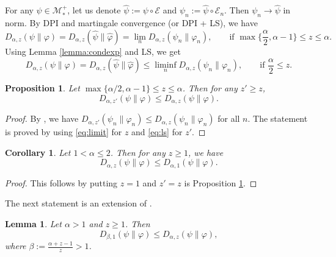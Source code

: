 \documentclass[12pt]{article}
\newtheorem{lemma}{Lemma}
\newtheorem{prop}{Proposition}
\newtheorem{coro}{Corollary}
\theoremstyle{definition}
\theoremstyle{remark}
\def\Me{\mathcal M}
\def\Ee{\mathcal E}
\begin{document}
 

For any $\psi\in \Me_*^+$, let us denote $\hat\psi:=\psi\circ\Ee$ and $\psi_n:=\hat
\psi\circ\Ee_n$. Then $\psi_n\to \hat \psi$ in norm. 
By DPI and  martingale convergence (or DPI + LS), we have
\begin{equation}\label{eq:limit}
D_{\alpha,z}(\psi\|\varphi)=D_{\alpha,z}(\hat\psi\|\hat\varphi)=\lim_nD_{\alpha,z}(\psi_n\|\varphi_n),\qquad \text{if }
\max\{\frac{\alpha}2,\alpha-1\}\le z\le \alpha.
\end{equation}
Using Lemma \ref{lemma:condexp} and  LS, we get 
\begin{equation}\label{eq:ls}
D_{\alpha,z}(\psi\|\varphi)=D_{\alpha,z}(\hat\psi\|\hat\varphi)\le \liminf_nD_{\alpha,z}(\psi_n\|\varphi_n),\qquad \text{if }
\frac{\alpha}2\le z.
\end{equation}


\begin{prop}\label{prop:monotz}
Let $\max\{\alpha/2,\alpha-1\}\le z\le \alpha$. Then for any $z'\ge z$,
\[
D_{\alpha,z'}(\psi\|\varphi)\le D_{\alpha,z}(\psi\|\varphi).
\]
\end{prop}

\begin{proof}
By \cite[Lemma 1.3]{FHnote3}, we have $D_{\alpha,z'}(\psi_n\|\varphi_n)\le
D_{\alpha,z}(\psi_n\|\varphi_n)$ for all $n$. The statement  is proved  by using \eqref{eq:limit} for $z$ and
\eqref{eq:ls} for $z'$.

\end{proof}


\begin{coro}\label{coro:bound1}
Let $1<\alpha\le 2$. Then for any $z\ge 1$, we have
\[
 D_{\alpha,z}(\psi\|\varphi)\le D_{\alpha,1}(\psi\|\varphi).
\]


\end{coro}

\begin{proof} This follows
by putting $z=1$ and $z'=z$ is  Proposition \ref{prop:monotz}.

\end{proof}

The next statement is an extension of \cite[Lemma 2]{AJnote2}.

\begin{lemma}\label{lemma:bounds} Let $\alpha>1$ and $z\ge 1$. 
Then
\[
D_{\beta,1}(\psi\|\varphi)\le D_{\alpha,z}(\psi\|\varphi),
\]
where $\beta:=\frac{\alpha+z-1}{z}>1$.


\end{lemma}
\end{document}
